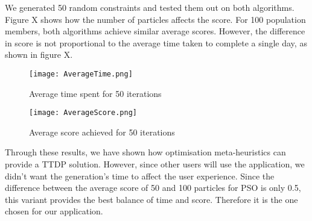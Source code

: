 We generated 50 random constraints and tested them out
on both algorithms. Figure X shows how the number of
particles affects the score. For 100 population
members, both algorithms achieve similar average
scores. However, the difference in score is not
proportional to the average time taken to complete a
single day, as shown in figure X.

\begin{figure}[h]
\centering
\texttt{[image: AverageTime.png]}
\caption{Average time spent for 50 iterations}
\label{AverageTime}
\end{figure}

\begin{figure}[h]
\centering
\texttt{[image: AverageScore.png]}
\caption{Average score achieved for 50 iterations}
\label{AverageScore}
\end{figure}


Through these results, we have shown how optimisation
meta-heuristics can provide a TTDP solution. However,
since other users will use the application, we didn't
want the generation's time to affect the user
experience. Since the difference between the average
score of 50 and 100 particles for PSO is only 0.5,
this variant provides the best balance of time and
score. Therefore it is the one chosen for our
application.   

